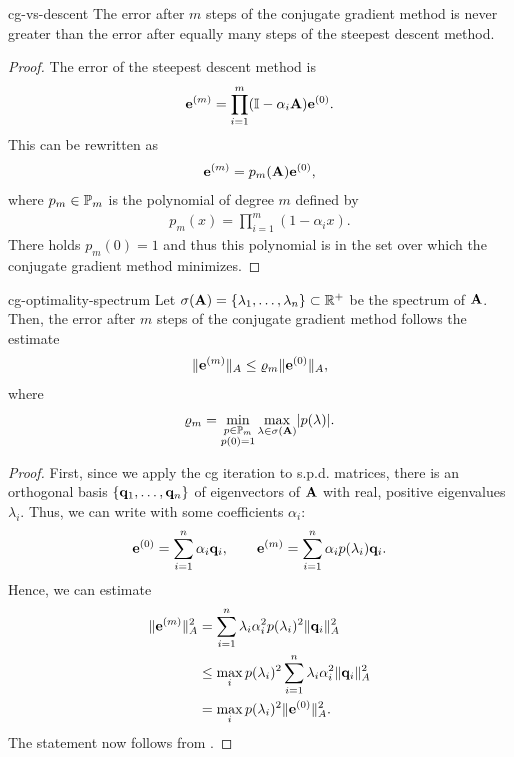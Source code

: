 \begin{Corollary}{cg-vs-descent}
  The error after $m$ steps of the conjugate gradient method is never
  greater than the error after equally many steps of the steepest
  descent method.
\end{Corollary}

\begin{proof}
  The error of the steepest descent method is
  \begin{gather}
    \ve^{(m)} = \prod_{i=1}^{m} (\id-\alpha_i\mata) \ve^{(0)}.
  \end{gather}
  This can be rewritten as
  \begin{gather}
    \ve^{(m)} = p_m(\mata) \ve^{(0)},
  \end{gather}
  where $p_m\in\P_m$ is the polynomial of degree $m$ defined by
  \begin{gather}
    p_m(x) = \prod_{i=1}^{m} (1-\alpha_ix).
  \end{gather}
  There holds $p_m(0)=1$ and thus this polynomial is in the set over
  which the conjugate gradient method minimizes.
\end{proof}

\begin{Corollary}{cg-optimality-spectrum}
  Let $\sigma(\mata) = \{\lambda_1,\dots,\lambda_n\} \subset \R^+$ be
  the spectrum of $\mata$. Then, the error after $m$ steps of the
  conjugate gradient method follows the estimate
  \begin{gather}
    \norm{\ve^{(m)}}_A \le \rho_m \norm{\ve^{(0)}}_A,
  \end{gather}
  where
  \begin{gather}
    \rho_m = \min_{\substack{p\in\P_m\\p(0) = 1}} \max_{\lambda\in\sigma(\mata)} \abs{p(\lambda)}.
  \end{gather}
\end{Corollary}

\begin{proof}
  First, since we apply the cg iteration to s.p.d. matrices, there is
  an orthogonal basis $\{\vq_1,\dots,\vq_n\}$ of eigenvectors of
  $\mata$ with real, positive eigenvalues $\lambda_i$. Thus, we can
  write with some coefficients $\alpha_i$:
  \begin{gather}
    \ve^{(0)} = \sum_{i=1}^n \alpha_i \vq_i,
    \qquad
    \ve^{(m)} = \sum_{i=1}^n \alpha_i p(\lambda_i) \vq_i.    
  \end{gather}
  Hence, we can estimate
  \begin{align}
    \norm{\ve^{(m)}}_A^2
    &= \sum_{i=1}^n \lambda_i\alpha_i^2 p(\lambda_i)^2 \norm{\vq_i}_A^2\\
    & \le \max_i p(\lambda_i)^2 \sum_{i=1}^n \lambda_i\alpha_i^2\norm{\vq_i}_A^2\\
    &= \max_i p(\lambda_i)^2 \norm{\ve^{(0)}}_A^2.
  \end{align}
  The statement now follows from .
\end{proof}

